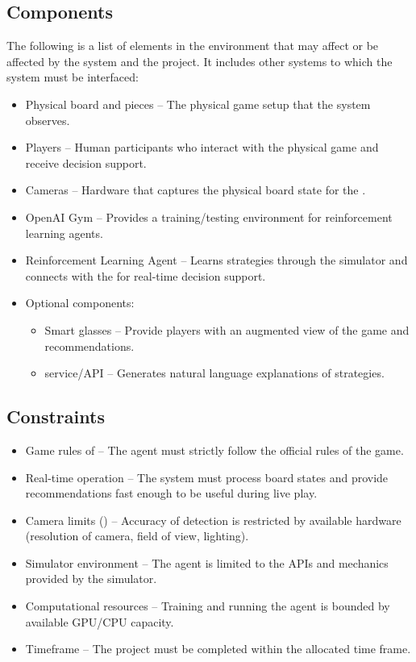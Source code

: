 \documentclass{article}
\begin{document}
\subsection{Components}\label{subsec:components2}
\raggedright The following is a list of elements in the environment that may affect or be affected by the system and the project.
It includes other systems to which the system must be interfaced:
\begin{itemize}
    \item {Physical \emph{\Catan{}} board and pieces} – The physical game setup that the system observes.
    \item {Players} – Human participants who interact with the physical game and receive decision support.
    \item {Cameras} – Hardware that captures the physical board state for the \DigitalTwin{}.
    \item {OpenAI Gym} – Provides a training/testing environment for reinforcement learning agents.
    \item {Reinforcement Learning Agent} – Learns strategies through the simulator and connects with the \DigitalTwin{} for real-time decision support.
    \item {Optional components:}
    \begin{itemize}
        \item {Smart glasses} – Provide players with an augmented view of the game and recommendations.
        \item {\LLM{} service/API} – Generates natural language explanations of strategies.
    \end{itemize}
\end{itemize}

\subsection{Constraints}\label{subsec:constraints}
\begin{itemize}
    \item {Game rules of \emph{\Catan{}}} – The \RL{} agent must strictly follow the official rules of the game.
    \item {Real-time operation} – The system must process board states and provide recommendations fast enough to be useful during live play.
    \item {Camera limits (\CV{})} – Accuracy of \GameState{} detection is restricted by available hardware (resolution of camera, field of view, lighting).
    \item {Simulator environment} – The \RL{} agent is limited to the APIs and mechanics provided by the \emph{\Catan{}} simulator.
    \item {Computational resources} – Training and running the \RL{} agent is bounded by available GPU/CPU capacity.
    \item {Timeframe} – The project must be completed within the allocated time frame.
\end{itemize}
\end{document}
